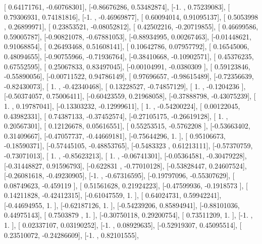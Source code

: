 \documentclass{article}
\begin{document}
       [ 0.64171761, -0.60768301],
       [-0.86676286,  0.53482874],
       [-1.        ,  0.75239083],
       [ 0.79306931,  0.74181816],
       [-1.        , -0.46969877],
       [ 0.60094014,  0.91095137],
       [ 0.5053998 ,  0.26899971],
       [ 0.23853521, -0.08052812],
       [ 0.42502216, -0.20719855],
       [ 0.46699586,  0.59005787],
       [-0.90821078, -0.67881053],
       [-0.88934995,  0.00267463],
       [-0.01448621,  0.91068854],
       [ 0.26493468,  0.51608141],
       [ 0.10642786,  0.07957792],
       [ 0.16545006,  0.48094655],
       [-0.90755966, -0.71936764],
       [-0.38410668, -0.10902571],
       [ 0.45376235,  0.67552595],
       [ 0.25067833,  0.83497045],
       [-0.00104991, -0.0380309 ],
       [ 0.59123846, -0.55890056],
       [-0.00711522,  0.94786149],
       [ 0.97696657, -0.98615489],
       [-0.72356639, -0.82430073],
       [ 1.        , -0.42340468],
       [ 0.13228527, -0.74857129],
       [ 1.        , -0.1204236 ],
       [-0.50374057,  0.75006411],
       [-0.60423559,  0.21968058],
       [-0.37888798, -0.43075239],
       [ 1.        ,  0.19787041],
       [-0.13303232, -0.12999611],
       [ 1.        , -0.54200224],
       [ 0.00122045,  0.43982331],
       [ 0.74387133, -0.37452574],
       [-0.27105175, -0.26619128],
       [ 1.        ,  0.20567301],
       [ 0.12126678,  0.05616551],
       [ 0.55253515, -0.5762208 ],
       [-0.53663402,  0.31409667],
       [-0.47057737, -0.44669181],
       [-0.75644296,  1.        ],
       [ 0.95106673, -0.18590371],
       [-0.57445105, -0.48853765],
       [-0.5483323 ,  0.61213111],
       [-0.57370759, -0.73071013],
       [ 1.        , -0.85623213],
       [ 1.        , -0.06741301],
       [-0.05364581, -0.30479228],
       [-0.31448827,  0.91596793],
       [-0.622831  , -0.77010128],
       [-0.53828447,  0.24607524],
       [-0.26081618, -0.49230905],
       [-1.        , -0.67316595],
       [-0.19797096, -0.55307629],
       [ 0.08749623, -0.459119  ],
       [ 0.51561628,  0.21924223],
       [-0.47599936, -0.1918573 ],
       [ 0.14211828, -0.42412315],
       [-0.61047559,  1.        ],
       [ 0.64024731,  0.59942241],
       [-0.44694955,  1.        ],
       [-0.62187126,  1.        ],
       [-0.54239206,  0.85894941],
       [-0.88101036,  0.44975143],
       [ 0.7503879 ,  1.        ],
       [-0.30750118,  0.29200754],
       [ 0.73511209,  1.        ],
       [-1.        ,  1.        ],
       [ 0.02337107,  0.03190252],
       [-1.        ,  0.08929635],
       [-0.52919307,  0.45095514],
       [ 0.23510072, -0.24286609],
       [-1.        ,  0.82101555],
\end{document}
